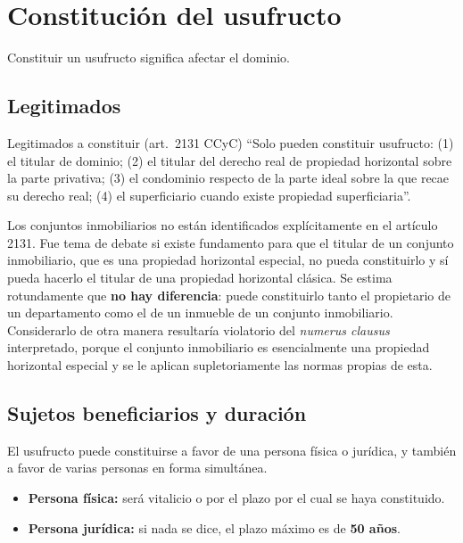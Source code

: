 \documentclass[12pt,oneside]{book}
\begin{document}
\section{Constitución del usufructo}

Constituir un usufructo significa afectar el dominio.

\subsection{Legitimados}

\begin{definicion}{Legitimados a constituir (art.~2131 CCyC)}
``Solo pueden constituir usufructo: (1) el titular de dominio; (2) el titular del derecho real de propiedad horizontal sobre la parte privativa; (3) el condominio respecto de la parte ideal sobre la que recae su derecho real; (4) el superficiario cuando existe propiedad superficiaria''.
\end{definicion}

Los conjuntos inmobiliarios no están identificados explícitamente en el artículo 2131. Fue tema de debate si existe fundamento para que el titular de un conjunto inmobiliario, que es una propiedad horizontal especial, no pueda constituirlo y sí pueda hacerlo el titular de una propiedad horizontal clásica. Se estima rotundamente que \textbf{no hay diferencia}: puede constituirlo tanto el propietario de un departamento como el de un inmueble de un conjunto inmobiliario. Considerarlo de otra manera resultaría violatorio del \textit{numerus clausus} interpretado, porque el conjunto inmobiliario es esencialmente una propiedad horizontal especial y se le aplican supletoriamente las normas propias de esta.

\subsection{Sujetos beneficiarios y duración}

El usufructo puede constituirse a favor de una persona física o jurídica, y también a favor de varias personas en forma simultánea.

\begin{itemize}
    \item \textbf{Persona física:} será vitalicio o por el plazo por el cual se haya constituido.
    \item \textbf{Persona jurídica:} si nada se dice, el plazo máximo es de \textbf{50 años}.
\end{itemize}
\end{document}
